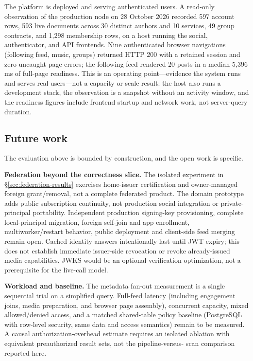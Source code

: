 \documentclass[sigconf, nonacm]{acmart}
\begin{document}
The platform is deployed and serving authenticated users. A read-only
observation of the production node on 28 October 2026 recorded 597 account
rows, 593 live documents across 30 distinct authors and 10 services, 49 group
contracts, and 1,298 membership rows, on a host running the social,
authenticator, and API frontends. Nine authenticated browser navigations
(following feed, music, groups) returned HTTP 200 with a retained session and
zero uncaught page errors; the following feed rendered 20 posts in a median
5,396\,ms of full-page readiness. This is an operating point---evidence the
system runs and serves real users---not a capacity or scale result: the host
also runs a development stack, the observation is a snapshot without an
activity window, and the readiness figures include frontend startup and network
work, not server-query duration.

\subsection{Future work}
\label{sec:limits}

The evaluation above is bounded by construction, and the open work is specific.

\textbf{Federation beyond the correctness slice.} The isolated experiment in
\S\ref{sec:federation-results} exercises home-issuer certification and
owner-managed foreign grant/removal, not a complete federated product.
The domain prototype adds public subscription continuity, not production social
integration or private-principal portability.
Independent production signing-key provisioning, complete local-principal
migration, foreign self-join and app enrollment, multiworker/restart behavior,
public deployment and client-side feed merging remain open. Cached identity
answers intentionally last until JWT expiry; this does not establish immediate
issuer-side revocation or revoke already-issued media capabilities. JWKS would
be an optional verification optimization, not a prerequisite for the live-call
model.

\textbf{Workload and baseline.} The metadata fan-out measurement is a single
sequential trial on a simplified query. Full-feed latency (including engagement
joins, media preparation, and browser page assembly), concurrent capacity,
mixed allowed/denied access, and a matched shared-table policy baseline
(PostgreSQL with row-level security, same data and access semantics) remain to
be measured. A causal authorization-overhead estimate requires an isolated
ablation with equivalent preauthorized result sets, not the pipeline-versus-
scan comparison reported here.
\end{document}
